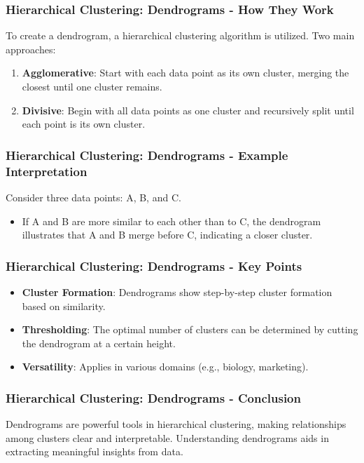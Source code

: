 \documentclass[aspectratio=169]{beamer}
\begin{document}
\begin{frame}[fragile]
    \frametitle{Hierarchical Clustering: Dendrograms - How They Work}
    To create a dendrogram, a hierarchical clustering algorithm is utilized. Two main approaches:
    \begin{enumerate}
        \item \textbf{Agglomerative}: Start with each data point as its own cluster, merging the closest until one cluster remains.
        \item \textbf{Divisive}: Begin with all data points as one cluster and recursively split until each point is its own cluster.
    \end{enumerate}
\end{frame}

\begin{frame}[fragile]
    \frametitle{Hierarchical Clustering: Dendrograms - Example Interpretation}
    Consider three data points: A, B, and C.
    \begin{itemize}
        \item If A and B are more similar to each other than to C, the dendrogram illustrates that A and B merge before C, indicating a closer cluster.
    \end{itemize}
\end{frame}

\begin{frame}[fragile]
    \frametitle{Hierarchical Clustering: Dendrograms - Key Points}
    \begin{itemize}
        \item \textbf{Cluster Formation}: Dendrograms show step-by-step cluster formation based on similarity.
        \item \textbf{Thresholding}: The optimal number of clusters can be determined by cutting the dendrogram at a certain height.
        \item \textbf{Versatility}: Applies in various domains (e.g., biology, marketing).
    \end{itemize}
\end{frame}

\begin{frame}[fragile]
    \frametitle{Hierarchical Clustering: Dendrograms - Conclusion}
    Dendrograms are powerful tools in hierarchical clustering, making relationships among clusters clear and interpretable. Understanding dendrograms aids in extracting meaningful insights from data.
\end{frame}
\end{document}
